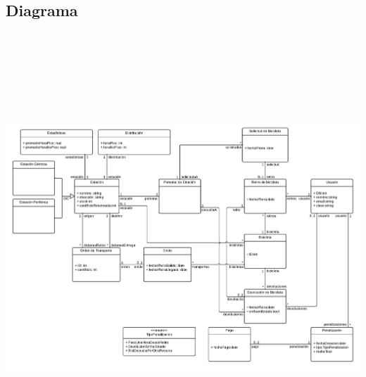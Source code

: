 \documentclass[a4paper, 10pt, twoside]{article}
\begin{document}
\subsection{Diagrama}

\includegraphics[height=16cm,angle=90]{diagramas/conceptual.pdf}
\end{document}
